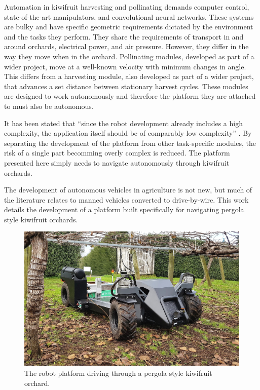 \documentclass[preprint,authoryear,12pt]{elsarticle}
\begin{document}
    Automation in kiwifruit harvesting and pollinating demands computer control, state-of-the-art manipulators, and convolutional neural networks.
    These systems are bulky and have specific geometric requirements dictated by the environment and the tasks they perform.
    They share the requirements of transport in and around orchards, electrical power, and air pressure.
    However, they differ in the way they move when in the orchard.
    Pollinating modules, developed as part of a wider project, move at a well-known velocity with minimum changes in angle.
    This differs from a harvesting module, also developed as part of a wider project, that advances a set distance between stationary harvest cycles.
    These modules are designed to work autonomously and therefore the platform they are attached to must also be autonomous.

    It has been stated that ``since the robot development already includes a high complexity, the application itself should be of comparably low complexity'' \citep{Ruckelshausen2009}.
    By separating the development of the platform from other task-specific modules, the risk of a single part becomming overly complex is reduced.
    The platform presented here simply needs to navigate autonomously through kiwifruit orchards.

    The development of autonomous vehicles in agriculture is not new, but much of the literature relates to manned vehicles converted to drive-by-wire.
    This work details the development of a platform built specifically for navigating pergola style kiwifruit orchards.

    \begin{figure}[htb]
        \centering
        \includegraphics[width=\linewidth]{imgs/photos/suzy_general.jpg}
        \caption{
            The robot platform driving through a pergola style kiwifruit orchard.
        }
        \label{fig:suzy}
    \end{figure}
\end{document}
